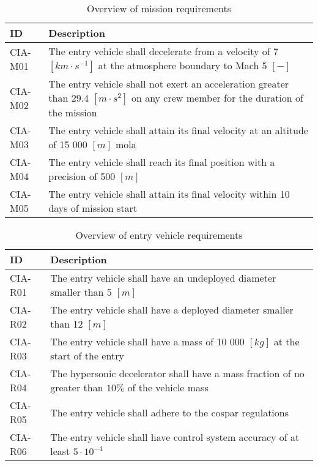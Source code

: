 \begin{table}[h]
	\caption{Overview of mission requirements}
	\label{tab:misreq} 
	\begin{tabular}{|p{}|p{}|}
    \hline
    \textbf{ID}          & \textbf{Description}                                                                                                      \\ \hline \hline
    CIA-M01& The entry vehicle shall decelerate from a velocity of 7 $[km\cdot s ^{-1}]$ at the atmosphere boundary to Mach 5 $[-]$  \\ \hline
    CIA-M02 & The entry vehicle shall not exert an acceleration greater than 29.4 $[m \cdot s^{2}]$ on any crew member for the duration of the mission			\\ \hline
    	CIA-M03 & The entry vehicle shall attain its final velocity at an altitude of 15 000 $[m]$ \gls{mola} \\ \hline
    	CIA-M04 & The entry vehicle shall reach its final position with a precision of 500 $[m]$\\ \hline
    	CIA-M05 & The entry vehicle shall attain its final velocity within 10 days of mission start \\ \hline
    \end{tabular}
\end{table}

\begin{table}[h]
	\caption{Overview of entry vehicle requirements} 
	\label{tab:vehreq}
	\begin{tabular}{|p{}|p{}|}
	    \hline
	    \textbf{ID}          & \textbf{Description}                                                                                                     \\ \hline \hline
	CIA-R01 & The entry vehicle shall have an undeployed diameter smaller than 5 $[m]$                         				            \\ \hline
	CIA-R02 & The entry vehicle shall have a deployed diameter smaller than 12 $[m]$                         				            \\ \hline	
	CIA-R03 & The entry vehicle shall have a mass of 10 000 $[kg]$ at the start of the entry                       				            \\ \hline
	CIA-R04 & The hypersonic decelerator shall have a mass fraction of no greater than $10\%$ of the vehicle mass  \\ \hline
	CIA-R05 &  The entry vehicle shall adhere to the \gls{cospar} regulations \\ \hline
	CIA-R06 &  The entry vehicle shall have control system accuracy of at least $5\cdot 10^{-4}$  \\ \hline
    \end{tabular}
\end{table}